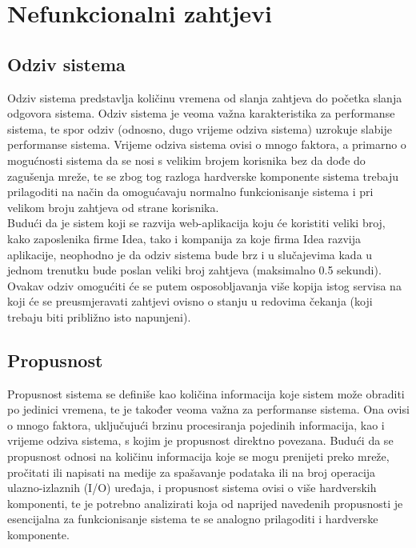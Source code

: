 \documentclass[12pt,a4paper]{article}
\begin{document}
\newpage

\section{Nefunkcionalni zahtjevi}

\subsection{Odziv sistema}

\quad Odziv sistema predstavlja količinu vremena od slanja zahtjeva do početka slanja odgovora sistema. Odziv sistema je veoma važna karakteristika za performanse sistema, te spor odziv (odnosno, dugo vrijeme odziva sistema) uzrokuje slabije performanse sistema. Vrijeme odziva sistema ovisi o mnogo faktora, a primarno o mogućnosti sistema da se nosi s velikim brojem korisnika bez da dođe do zagušenja mreže, te se zbog tog razloga hardverske komponente sistema trebaju prilagoditi na način da omogućavaju normalno funkcionisanje sistema i pri velikom broju zahtjeva od strane korisnika. \\

Budući da je sistem koji se razvija web-aplikacija koju će koristiti veliki broj, kako zaposlenika firme Idea, tako i kompanija za koje firma Idea razvija aplikacije, neophodno je da odziv sistema bude brz i u slučajevima kada u jednom trenutku bude poslan veliki broj zahtjeva (maksimalno 0.5 sekundi). Ovakav odziv omogućiti će se putem osposobljavanja više kopija istog servisa na koji će se preusmjeravati zahtjevi ovisno o stanju u redovima čekanja (koji trebaju biti približno isto napunjeni).

\subsection{Propusnost}

\quad Propusnost sistema se definiše kao količina informacija koje sistem može obraditi po jedinici vremena, te je također veoma važna za performanse sistema. Ona ovisi o mnogo faktora, uključujući brzinu procesiranja pojedinih informacija, kao i vrijeme odziva sistema, s kojim je propusnost direktno povezana. Budući da se propusnost odnosi na količinu informacija koje se mogu prenijeti preko mreže, pročitati ili napisati na medije za spašavanje podataka ili na broj operacija ulazno-izlaznih (I/O) uređaja, i propusnost sistema ovisi o više hardverskih komponenti, te je potrebno analizirati koja od naprijed navedenih propusnosti je esencijalna za funkcionisanje sistema te se analogno prilagoditi i hardverske komponente. \\
\end{document}
